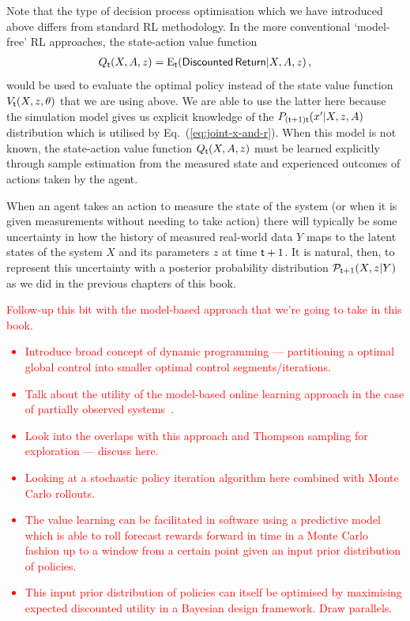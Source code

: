 Note that the type of decision process optimisation which we have introduced above differs from standard RL methodology. In the more conventional `model-free' RL approaches, the state-action value function 
\begin{align}
Q_{{\sf t}}(X,A,z)={\rm E}_{{\sf t}}({\sf Discounted \,Return}\vert X,A,z) \,,
\end{align}
would be used to evaluate the optimal policy instead of the state value function $V_{{\sf t}}(X,z,\theta )$ that we are using above. We are able to use the latter here because the simulation model gives us explicit knowledge of the $P_{({\sf t}+1){\sf t}}(x'\vert X,z,A)$ distribution which is utilised by Eq.~(\ref{eq:joint-x-and-r}). When this model is not known, the state-action value function $Q_{{\sf t}}(X,A,z)$ must be learned explicitly through sample estimation from the measured state and experienced outcomes of actions taken by the agent.

When an agent takes an action to measure the state of the system (or when it is given measurements without needing to take action) there will typically be some uncertainty in how the history of measured real-world data $Y$ maps to the latent states of the system $X$ and its parameters $z$ at time ${\sf t}+1$. It is natural, then, to represent this uncertainty with a posterior probability distribution ${\cal P}_{{\sf t}+1}(X,z\vert Y)$ as we did in the previous chapters of this book.

\textcolor{red}{
Follow-up this bit with the model-based approach that we're going to take in this book.
\begin{itemize}
\item{Introduce broad concept of dynamic programming --- partitioning a optimal global control into smaller optimal control segments/iterations.}
\item{Talk about the utility of the model-based online learning approach in the case of partially observed systems~\cite{aastrom1965optimal}.}
\item{Look into the overlaps with this approach and Thompson sampling for exploration --- discuss here.}
\item{Looking at a stochastic policy iteration algorithm here combined with Monte Carlo rollouts.}
\item{The value learning can be facilitated in software using a predictive model which is able to roll forecast rewards forward in time in a Monte Carlo fashion up to a window from a certain point given an input prior distribution of policies.}
\item{This input prior distribution of policies can itself be optimised by maximising expected discounted utility in a Bayesian design framework. Draw parallels.}
\end{itemize}
}